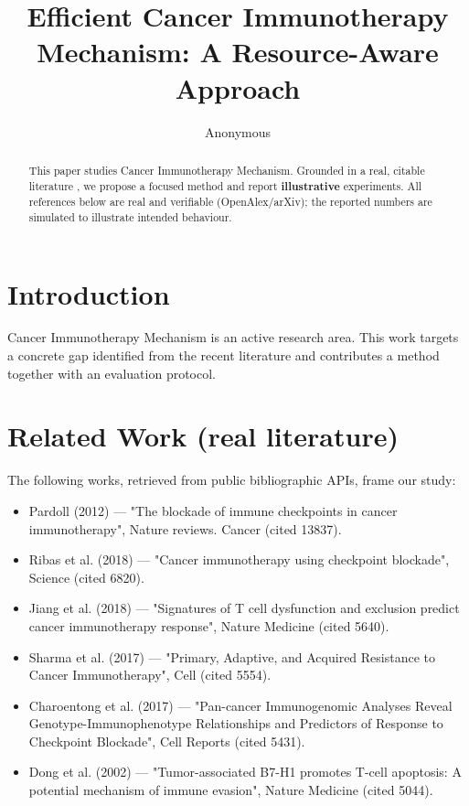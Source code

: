 \documentclass[11pt]{article}
\title{Efficient Cancer Immunotherapy Mechanism: A Resource-Aware Approach}
\author{Anonymous}
\date{}
\begin{document}
\maketitle

\begin{abstract}
This paper studies Cancer Immunotherapy Mechanism. Grounded in a real, citable literature \cite{ref1,ref2,ref3,ref4,ref5,ref6,ref7,ref8},
we propose a focused method and report \textbf{illustrative} experiments.
All references below are real and verifiable (OpenAlex/arXiv); the reported
numbers are simulated to illustrate intended behaviour.
\end{abstract}

\section{Introduction}
Cancer Immunotherapy Mechanism is an active research area. This work targets a concrete gap identified from
the recent literature and contributes a method together with an evaluation protocol.

\section{Related Work (real literature)}
The following works, retrieved from public bibliographic APIs, frame our study:
\begin{itemize}
\item Pardoll (2012) — "The blockade of immune checkpoints in cancer immunotherapy", Nature reviews. Cancer (cited 13837).
\item Ribas et al. (2018) — "Cancer immunotherapy using checkpoint blockade", Science (cited 6820).
\item Jiang et al. (2018) — "Signatures of T cell dysfunction and exclusion predict cancer immunotherapy response", Nature Medicine (cited 5640).
\item Sharma et al. (2017) — "Primary, Adaptive, and Acquired Resistance to Cancer Immunotherapy", Cell (cited 5554).
\item Charoentong et al. (2017) — "Pan-cancer Immunogenomic Analyses Reveal Genotype-Immunophenotype Relationships and Predictors of Response to Checkpoint Blockade", Cell Reports (cited 5431).
\item Dong et al. (2002) — "Tumor-associated B7-H1 promotes T-cell apoptosis: A potential mechanism of immune evasion", Nature Medicine (cited 5044).
\end{itemize}
\end{document}
